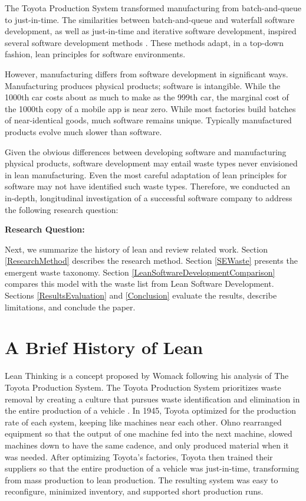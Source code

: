 The Toyota Production System \cite{OhnoToyotaProductionSystem, ShingoToyotaProductionSystem} transformed manufacturing from batch-and-queue to just-in-time. The similarities between batch-and-queue and waterfall software development, as well as just-in-time and iterative software development, inspired several software development methods \cite{PoppendieckLeanSoftwareDevelopment, AndersonKanban}. These methods adapt, in a top-down fashion, lean principles for software environments. 

However, manufacturing differs from software development in significant ways. Manufacturing produces physical products; software is intangible. While the 1000th car costs about as much to make as the 999th car, the marginal cost of the 1000th copy of a mobile app is near zero. While most factories build batches of near-identical goods, much software remains unique. Typically manufactured products evolve much slower than software.

 
Given the obvious differences between developing software and manufacturing physical products, software development may entail waste types never envisioned in lean manufacturing. Even the most careful adaptation of lean principles for software may not have identified such waste types. Therefore, we conducted an in-depth, longitudinal investigation of a successful software company to address the following research question: 

\textbf{Research Question: }

Next, we summarize the history of lean and review related work. Section \ref{ResearchMethod} describes the research method. Section \ref{SEWaste} presents the emergent waste taxonomy. Section \ref{LeanSoftwareDevelopmentComparison} compares this model with the waste list from Lean Software Development. Sections \ref{ResultsEvaluation} and \ref{Conclusion} evaluate the results, describe limitations, and conclude the paper.

\section{A Brief History of Lean}
\label{HistoryOfLean}
Lean Thinking is a concept proposed by Womack \cite{WomackLeanThinking} following his analysis of The Toyota Production System. The Toyota Production System prioritizes waste removal by creating a culture that pursues waste identification and elimination in the entire production of a vehicle \cite{OhnoToyotaProductionSystem, ShingoToyotaProductionSystem}. In 1945, Toyota optimized for the production rate of each system, keeping like machines near each other. Ohno rearranged equipment so that the output of one machine fed into the next machine, slowed machines down to have the same cadence, and only produced material when it was needed. After optimizing Toyota's factories, Toyota then trained their suppliers so that the entire production of a vehicle was just-in-time, transforming from mass production to lean production. The resulting  system was easy to reconfigure, minimized inventory, and supported short production runs.  

